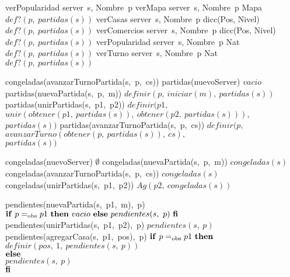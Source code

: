 \begin{tad}{}
    \tadOtrasOperaciones
    \tadAlinearFunciones
    {verPopularidad}
    {server\ s, Nombre\ p}
        \tadOperacion
            {verMapa}
            {server\ s, Nombre\ p}
            {Mapa}
            {$def?(p,\ partidas(s))$}
        \tadOperacion
            {verCasas}
            {server\ s, Nombre\ p}
            {dicc(Pos, Nivel)}
            {$def?(p,\ partidas(s))$}        
        \tadOperacion
            {verComercios}
            {server\ s, Nombre\ p}
            {dicc(Pos, Nivel)}
            {$def?(p,\ partidas(s))$}
        \tadOperacion
            {verPopularidad}
            {server\ s, Nombre\ p}
            {Nat}
            {$def?(p,\ partidas(s))$}
        \tadOperacion
            {verTurno}
            {server\ s, Nombre\ p}
            {Nat}
            {$def?(p,\ partidas(s))$}

\vspace{3mm}
    \tadAlinearAxiomas
    {congeladas(avanzarTurnoPartida(s,\ p,\ cs))}
        \tadAxioma
            {partidas(nuevoServer)}
            {$vacio$}
        \tadAxioma
            {partidas(nuevaPartida(s,\ p,\ m))}
            {$definir(p,\ iniciar(m),\ partidas(s))$}
        \tadAxioma
            {partidas(unirPartidas(s,\ p1,\ p2))}
            {$definir(p1,\ $\\$ 
            $\tab$ unir(obtener(p1,\ partidas(s)),\ obtener(p2,\ partidas(s))),\ $\\$ 
            $\tab$ partidas(s))$}
        \tadAxioma
            {partidas(avanzarTurnoPartida(s,\ p,\ cs))}
            {$definir(p,\ $\\$
            $\tab$ avanzarTurno(obtener(p,\ partidas(s)),\ cs),\ $\\$
            $\tab$ partidas(s))$}

        \tadAxioma
            {congeladas(nuevoServer)}
            {$\emptyset$}         
        \tadAxioma    
            {congeladas(nuevaPartida(s,\ p,\ m))}
            {$congeladas(s)$}
        \tadAxioma
            {congeladas(avanzarTurnoPartida(s,\ p,\ cs))}
            {$ congeladas(s)$}
        \tadAxioma
            {congeladas(unirPartidas(s,\ p1,\ p2))}
            {$ Ag(p2,\ congeladas(s))  $}

        \tadAxioma
            {pendientes(nuevaPartida(s,\ p1,\ m),\ p)}
            {$\LIF\ p \igobs p1\ \LTHEN\ vacio\ \LELSE\ pendientes(s,\ p)\ \LFI$}
        \tadAxioma
            {pendientes(unirPartidas(s,\ p1,\ p2),\ p)}
            {$pendientes(s,\ p)$}
        \tadAxioma
            {pendientes(agregarCasa(s,\ p1,\ pos),\ p)}
            {$\textrm{\textbf{if}}\ p =_{\mathrm{obs}} p1\ \textrm{\textbf{then}}\ $\\$
            $\tab$ definir(pos,\ 1,\ pendientes(s,\ p)) $\\$
            \textrm{\textbf{else}}\ $\\$
            $\tab$ pendientes(s,\ p)\ $\\$
            \textrm{\textbf{fi}}$}    


\end{tad}
